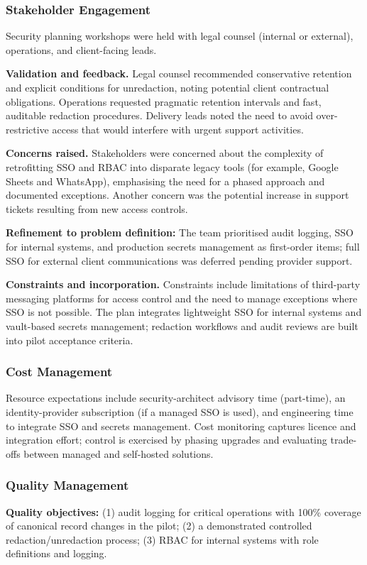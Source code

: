 \documentclass[12pt,a4paper]{report}
\begin{document}
\subsubsection{Stakeholder Engagement}
Security planning workshops were held with legal counsel (internal or external), operations, and client-facing leads.

\textbf{Validation and feedback.} Legal counsel recommended conservative retention and explicit conditions for unredaction, noting potential client contractual obligations. Operations requested pragmatic retention intervals and fast, auditable redaction procedures. Delivery leads noted the need to avoid over-restrictive access that would interfere with urgent support activities.

\textbf{Concerns raised.} Stakeholders were concerned about the complexity of retrofitting SSO and RBAC into disparate legacy tools (for example, Google Sheets and WhatsApp), emphasising the need for a phased approach and documented exceptions. Another concern was the potential increase in support tickets resulting from new access controls.

\begin{noteBox}
\textbf{Refinement to problem definition:} The team prioritised audit logging, SSO for internal systems, and production secrets management as first-order items; full SSO for external client communications was deferred pending provider support.
\end{noteBox}

\textbf{Constraints and incorporation.} Constraints include limitations of third-party messaging platforms for access control and the need to manage exceptions where SSO is not possible. The plan integrates lightweight SSO for internal systems and vault-based secrets management; redaction workflows and audit reviews are built into pilot acceptance criteria.

\subsubsection{Cost Management}
Resource expectations include security-architect advisory time (part-time), an identity-provider subscription (if a managed SSO is used), and engineering time to integrate SSO and secrets management. Cost monitoring captures licence and integration effort; control is exercised by phasing upgrades and evaluating trade-offs between managed and self-hosted solutions.

\subsubsection{Quality Management}
\begin{summaryBox}
\textbf{Quality objectives:} (1) audit logging for critical operations with 100\% coverage of canonical record changes in the pilot; (2) a demonstrated controlled redaction/unredaction process; (3) RBAC for internal systems with role definitions and logging.
\end{summaryBox}
\end{document}
